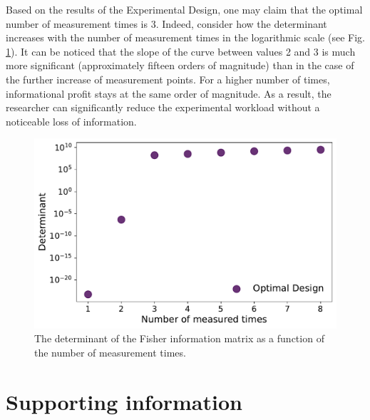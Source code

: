 \documentclass[10pt,A4paper]{article}
\begin{document}
Based on the results of the Experimental Design, one may claim that the optimal number of measurement times is 3.
Indeed, consider how the determinant increases with the number of measurement times in the logarithmic scale (see Fig. \ref{fig:det_vs_ntimes}).
It can be noticed that the slope of the curve between values 2 and 3 is much more significant (approximately fifteen orders of magnitude) than in the case of the further increase of measurement points.
For a higher number of times, informational profit stays at the same order of magnitude.
As a result, the researcher can significantly reduce the experimental workload without a noticeable loss of information.
\begin{figure}[H]
    \centering
    \includegraphics[scale=0.4]{Figures/det_vs_ntimes.pdf}
    \caption{{\footnotesize The determinant of the Fisher information matrix as a function of the number of measurement times.}}
    \label{fig:det_vs_ntimes}
\end{figure}
%
%
%
\section*{Supporting information}
%
%
%
\nolinenumbers

\end{document}
